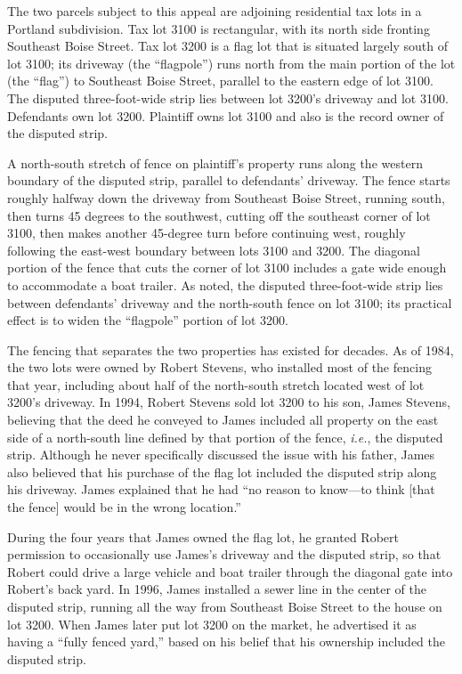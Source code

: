 The two parcels subject to this appeal are adjoining residential tax lots in a
Portland subdivision. Tax lot 3100 is rectangular, with its north side fronting
Southeast Boise Street. Tax lot 3200 is a flag lot that is situated largely
south of lot 3100; its driveway (the ``flagpole'') runs north from the main
portion of the lot (the ``flag'') to Southeast Boise Street, parallel to the
eastern edge of lot 3100. The disputed three-foot-wide strip lies between lot
3200's driveway and lot 3100. Defendants own lot 3200. Plaintiff owns lot 3100
and also is the record owner of the disputed strip. 

A north-south stretch of fence on plaintiff's property runs along the western
boundary of the disputed strip, parallel to defendants' driveway. The fence
starts roughly halfway down the driveway from Southeast Boise Street, running
south, then turns 45 degrees to the southwest, cutting off the southeast corner
of lot 3100, then makes another 45-degree turn before continuing west, roughly
following the east-west boundary between lots 3100 and 3200. The diagonal
portion of the fence that cuts the corner of lot 3100 includes a gate wide
enough to accommodate a boat trailer. As noted, the disputed three-foot-wide
strip lies between defendants' driveway and the north-south fence on lot 3100;
its practical effect is to widen the ``flagpole'' portion of lot 3200. 

The fencing that separates the two properties has existed for decades. As of
1984, the two lots were owned by Robert Stevens, who installed most of the
fencing that year, including about half of the north-south stretch located west
of lot 3200's driveway. In 1994, Robert Stevens sold lot 3200 to his son, James
Stevens, believing that the deed he conveyed to James included all property on
the east side of a north-south line defined by that portion of the fence,
\textit{i.e.}, the disputed strip. Although he never specifically discussed the
issue with his father, James also believed that his purchase of the
flag lot included the disputed strip along his driveway. James explained that
he had ``no reason to know---to think [that the fence] would be in the wrong
location.''

During the four years that James owned the flag lot, he granted Robert
permission to occasionally use James's driveway and the disputed strip, so that
Robert could drive a large vehicle and boat trailer through the diagonal gate
into Robert's back yard. In 1996, James installed a sewer line in the center of
the disputed strip, running all the way from Southeast Boise Street to the
house on lot 3200. When James later put lot 3200 on the market, he advertised
it as having a ``fully fenced yard,'' based on his belief that his ownership
included the disputed strip.

